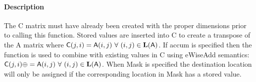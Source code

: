 \paragraph{Description}


The {\sf C} matrix must have already been created with the proper dimensions
prior to calling this function.  Stored values are inserted into {\sf C} to
create a transpose of the {\sf A} matrix where 
${\sf C}(j,i) = {\sf A}(i,j) ~ \forall ~ (i,j) \in \bold{L}({\sf A})$.
If accum is specified then the function is used to combine with existing values in {\sf C} using {\sf eWiseAdd} semantics:
${\sf C}(j,i) \oplus = {\sf A}(i,j) ~ \forall ~ (i,j) \in \bold{L}({\sf A})$.
When {\sf Mask} is specified the destination location will only be assigned if the corresponding location in {\sf Mask} has a stored value.
